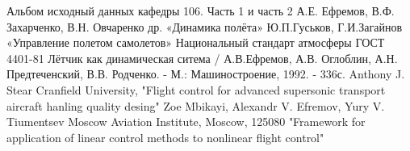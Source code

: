 \newpage
\pagestyle{fancy}
\fancyhf{}
\rfoot{\thepage}

\begin{thebibliography}{10}
    Альбом исходный данных кафедры 106. Часть 1 и часть 2   
    А.Е. Ефремов, В.Ф. Захарченко, В.Н. Овчаренко др. «Динамика полёта»
    Ю.П.Гуськов, Г.И.Загайнов «Управление полетом самолетов»
    Национальный стандарт атмосферы ГОСТ 4401-81
    Лётчик как динамическая ситема / А.В.Ефремов, А.В. Оглоблин, А.Н. Предтеченский, В.В. Родченко. - М.: Машиностроение, 1992. - 336с.
    Anthony J. Stear Cranfield University, "Flight control for advanced supersonic transport aircraft hanling quality desing" 
    Zoe Mbikayi, Alexandr V. Efremov, Yury V. Tiumentsev Moscow Aviation Institute, Moscow, 125080 "Framework for application of linear control methods to nonlinear  flight control"
\end{thebibliography}